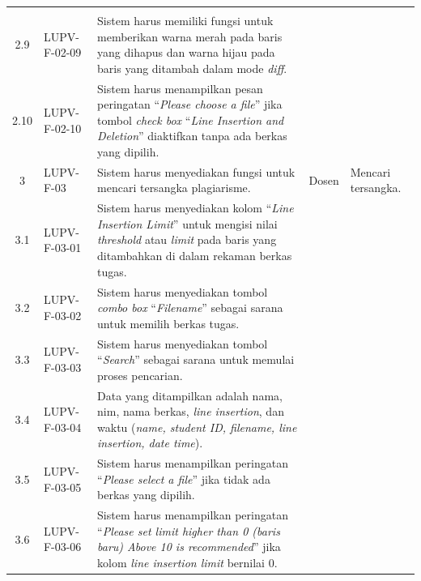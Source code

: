 {\begin{longtable}{|c|L{2.5cm}|L{5cm}|L{1.8cm}|L{2.1cm}|}
                                                           & \\
    2.9 & LUPV-F-02-09 & Sistem harus memiliki fungsi untuk memberikan
                         warna merah pada baris yang dihapus dan warna
                         hijau pada baris yang ditambah dalam mode
                         \emph{diff}. & & \\
    2.10 & LUPV-F-02-10 & Sistem harus menampilkan pesan peringatan ``\emph{Please choose a file}'' jika
                         tombol \emph{check box} ``\emph{Line Insertion and Deletion}'' diaktifkan
                         tanpa ada berkas yang dipilih. & &\\\hline
    3 & LUPV-F-03 & Sistem harus menyediakan fungsi untuk mencari
                    tersangka plagiarisme. & Dosen & Mencari tersangka. \\
    3.1 & LUPV-F-03-01 & Sistem harus menyediakan kolom ``\emph{Line
                         Insertion Limit}'' untuk mengisi nilai
                         \emph{threshold} atau \emph{limit} pada baris
                         yang ditambahkan di dalam rekaman berkas
                         tugas. & & \\
    3.2 & LUPV-F-03-02 & Sistem harus menyediakan tombol
                         \emph{combo box} ``\emph{Filename}'' sebagai
                         sarana untuk memilih berkas tugas. & & \\
    3.3 & LUPV-F-03-03 & Sistem harus menyediakan tombol
                         ``\emph{Search}'' sebagai sarana untuk
                         memulai proses pencarian. & & \\
    3.4 & LUPV-F-03-04 & Data yang ditampilkan adalah nama, nim, nama
                         berkas, \emph{line insertion}, dan waktu (\emph{name, student ID,
                         filename, line insertion, date time}). & & \\
    3.5 & LUPV-F-03-05 & Sistem harus menampilkan peringatan
                         ``\emph{Please select a file}'' jika
                         tidak ada berkas yang dipilih. & & \\
    3.6 & LUPV-F-03-06 & Sistem harus menampilkan peringatan
                         ``\emph{Please set limit higher than 0 (baris baru) Above
                         10 is recommended}'' jika
                         kolom \emph{line insertion limit} bernilai 0. & & \\

\end{longtable}}
